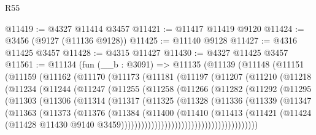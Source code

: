 \begin{lexlean}{R55}
\begin{coremodule}
@11419 := @4327 @11414 @3457
@11421 := @11417 @11419 @9120
@11424 := @3456 (@9127 (@11136 @9128))
@11425 := @11140 @9128
@11427 := @4316 @11425 @3457
@11428 := @4315 @11427
@11430 := @4327 @11425 @3457
@11561 := @11134
    (fun (__b : @3091) =>
    @11135
      (@11139
        (@11148
          (@11151
            (@11159
              (@11162
                (@11170
                  (@11173
                    (@11181
                      (@11197
                        (@11207
                          (@11210
                            (@11218
                              (@11234
                                (@11244
                                  (@11247
                                    (@11255
                                      (@11258
                                        (@11266
                                          (@11282
                                            (@11292
                                              (@11295
                                                (@11303
                                                  (@11306
                                                    (@11314
                                                      (@11317
                                                        (@11325
                                                          (@11328
                                                            (@11336
                                                              (@11339
                                                                (@11347
                                                                  (@11363
                                                                    (@11373
                                                                      (@11376
                                                                        (@11384
                                                                          (@11400
                                                                            (@11410
                                                                              (@11413
                                                                                (@11421
                                                                                  (@11424
                                                                                    (@11428
                                                                                      @11430
                                                                                      @9140
                                                                                      @3459)))))))))))))))))))))))))))))))))))))))))

\end{coremodule}
\end{lexlean}
